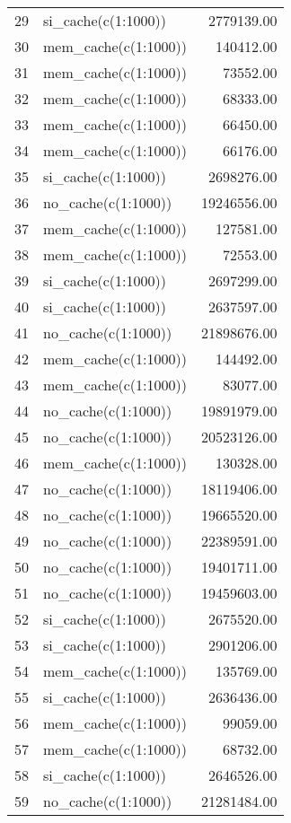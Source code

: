 \begin{table}[ht]
\begin{tabular}{rlr}
  29 & si\_cache(c(1:1000)) & 2779139.00 \\ 
  30 & mem\_cache(c(1:1000)) & 140412.00 \\ 
  31 & mem\_cache(c(1:1000)) & 73552.00 \\ 
  32 & mem\_cache(c(1:1000)) & 68333.00 \\ 
  33 & mem\_cache(c(1:1000)) & 66450.00 \\ 
  34 & mem\_cache(c(1:1000)) & 66176.00 \\ 
  35 & si\_cache(c(1:1000)) & 2698276.00 \\ 
  36 & no\_cache(c(1:1000)) & 19246556.00 \\ 
  37 & mem\_cache(c(1:1000)) & 127581.00 \\ 
  38 & mem\_cache(c(1:1000)) & 72553.00 \\ 
  39 & si\_cache(c(1:1000)) & 2697299.00 \\ 
  40 & si\_cache(c(1:1000)) & 2637597.00 \\ 
  41 & no\_cache(c(1:1000)) & 21898676.00 \\ 
  42 & mem\_cache(c(1:1000)) & 144492.00 \\ 
  43 & mem\_cache(c(1:1000)) & 83077.00 \\ 
  44 & no\_cache(c(1:1000)) & 19891979.00 \\ 
  45 & no\_cache(c(1:1000)) & 20523126.00 \\ 
  46 & mem\_cache(c(1:1000)) & 130328.00 \\ 
  47 & no\_cache(c(1:1000)) & 18119406.00 \\ 
  48 & no\_cache(c(1:1000)) & 19665520.00 \\ 
  49 & no\_cache(c(1:1000)) & 22389591.00 \\ 
  50 & no\_cache(c(1:1000)) & 19401711.00 \\ 
  51 & no\_cache(c(1:1000)) & 19459603.00 \\ 
  52 & si\_cache(c(1:1000)) & 2675520.00 \\ 
  53 & si\_cache(c(1:1000)) & 2901206.00 \\ 
  54 & mem\_cache(c(1:1000)) & 135769.00 \\ 
  55 & si\_cache(c(1:1000)) & 2636436.00 \\ 
  56 & mem\_cache(c(1:1000)) & 99059.00 \\ 
  57 & mem\_cache(c(1:1000)) & 68732.00 \\ 
  58 & si\_cache(c(1:1000)) & 2646526.00 \\ 
  59 & no\_cache(c(1:1000)) & 21281484.00 \\ 

\end{tabular}
\end{table}
